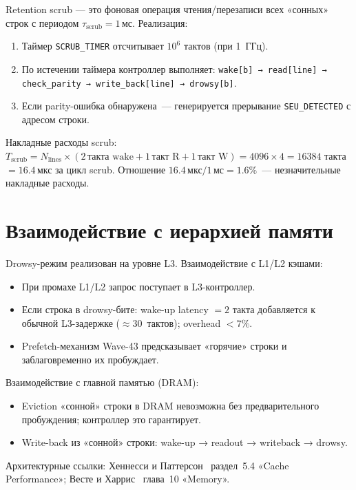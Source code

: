 Retention scrub — это фоновая операция чтения/перезаписи
всех «сонных» строк с периодом $\tau_\mathrm{scrub} = 1\,\text{мс}$.
Реализация:
\begin{enumerate}
  \item Таймер \texttt{SCRUB\_TIMER} отсчитывает $10^6$ тактов (при 1~ГГц).
  \item По истечении таймера контроллер выполняет:
        \texttt{wake[b] → read[line] → check\_parity → write\_back[line] → drowsy[b]}.
  \item Если parity-ошибка обнаружена~--- генерируется прерывание
        \texttt{SEU\_DETECTED} с адресом строки.
\end{enumerate}
Накладные расходы scrub:
$T_\mathrm{scrub} = N_\mathrm{lines} \times (2\,\text{такта wake} + 1\,\text{такт R} + 1\,\text{такт W}) = 4096 \times 4 = 16384$ такта
$= 16.4\,\text{мкс}$ за цикл scrub.
Отношение $16.4\,\text{мкс} / 1\,\text{мс} = 1.6\%$~--- незначительные накладные расходы.

\section{Взаимодействие с иерархией памяти}
\label{sec:glava89-hierarchy}

Drowsy-режим реализован на уровне L3.
Взаимодействие с L1/L2 кэшами:
\begin{itemize}
  \item При промахе L1/L2 запрос поступает в L3-контроллер.
  \item Если строка в drowsy-бите: wake-up latency $= 2$ такта
        добавляется к обычной L3-задержке ($\approx 30$~тактов);
        overhead $< 7\%$.
  \item Prefetch-механизм Wave-43 предсказывает «горячие» строки
        и заблаговременно их пробуждает.
\end{itemize}
Взаимодействие с главной памятью (DRAM):
\begin{itemize}
  \item Eviction «сонной» строки в DRAM невозможна без предварительного
        пробуждения; контроллер это гарантирует.
  \item Write-back из «сонной» строки: wake-up → readout → writeback → drowsy.
\end{itemize}
Архитектурные ссылки: Хеннесси и Паттерсон~\cite{Hennessy-Patterson-CA6}
раздел~5.4 «Cache Performance»; Весте и Харрис~\cite{Weste-Harris-CMOS4}
глава~10 «Memory».

